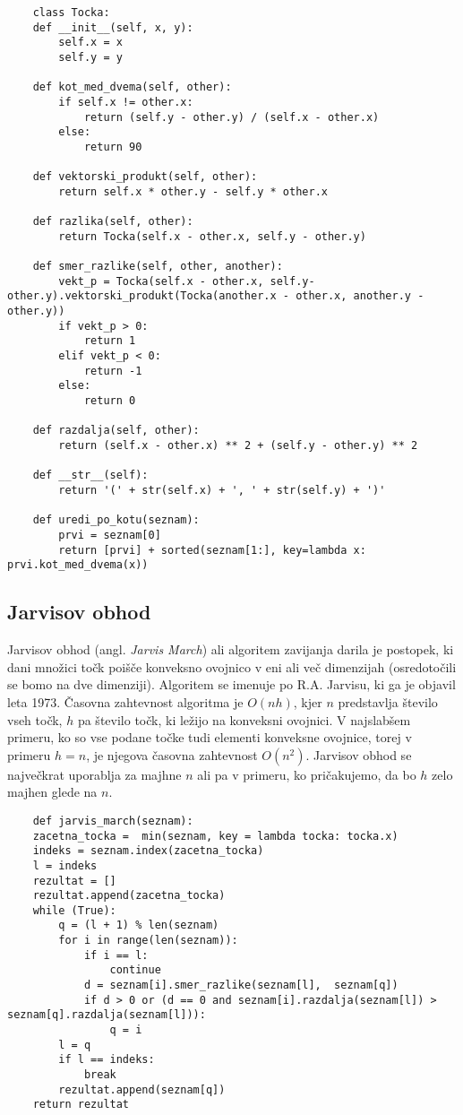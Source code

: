 \documentclass[a4paper]{article}
\begin{document}
\begin{lstlisting}
    class Tocka:
    def __init__(self, x, y):
        self.x = x
        self.y = y

    def kot_med_dvema(self, other):
        if self.x != other.x:
            return (self.y - other.y) / (self.x - other.x)
        else:
            return 90

    def vektorski_produkt(self, other): 
        return self.x * other.y - self.y * other.x

    def razlika(self, other):
    	return Tocka(self.x - other.x, self.y - other.y)

    def smer_razlike(self, other, another):
        vekt_p = Tocka(self.x - other.x, self.y-other.y).vektorski_produkt(Tocka(another.x - other.x, another.y - other.y))
        if vekt_p > 0:
            return 1
        elif vekt_p < 0:
            return -1
        else:
            return 0
    
    def razdalja(self, other):
        return (self.x - other.x) ** 2 + (self.y - other.y) ** 2

    def __str__(self):
        return '(' + str(self.x) + ', ' + str(self.y) + ')'

    def uredi_po_kotu(seznam):
        prvi = seznam[0]
        return [prvi] + sorted(seznam[1:], key=lambda x: prvi.kot_med_dvema(x))
\end{lstlisting}

\subsection{Jarvisov obhod}
Jarvisov obhod (angl. \textit{Jarvis March}) ali algoritem zavijanja darila je postopek, ki dani množici točk poišče konveksno ovojnico v eni ali več dimenzijah (osredotočili se 
bomo na dve dimenziji). Algoritem se imenuje po R.A. Jarvisu, ki ga je objavil leta 1973. Časovna zahtevnost algoritma je $O(nh)$, kjer $n$ predstavlja število vseh točk, $h$ pa 
število točk, ki ležijo na konveksni ovojnici. V najslabšem primeru, ko so vse podane točke tudi elementi konveksne ovojnice, torej v primeru $h = n$, je njegova časovna zahtevnost 
$O(n^2)$. Jarvisov obhod se največkrat uporablja za majhne $n$ ali pa v primeru, ko pričakujemo, da bo $h$ zelo majhen glede na $n$.

\begin{lstlisting}
    def jarvis_march(seznam):
    zacetna_tocka =  min(seznam, key = lambda tocka: tocka.x)
    indeks = seznam.index(zacetna_tocka)
    l = indeks
    rezultat = []
    rezultat.append(zacetna_tocka)
    while (True):
        q = (l + 1) % len(seznam)
        for i in range(len(seznam)):
            if i == l:
                continue
            d = seznam[i].smer_razlike(seznam[l],  seznam[q])
            if d > 0 or (d == 0 and seznam[i].razdalja(seznam[l]) > seznam[q].razdalja(seznam[l])):
                q = i
        l = q
        if l == indeks:
            break 
        rezultat.append(seznam[q])
    return rezultat
\end{lstlisting}
\end{document}
